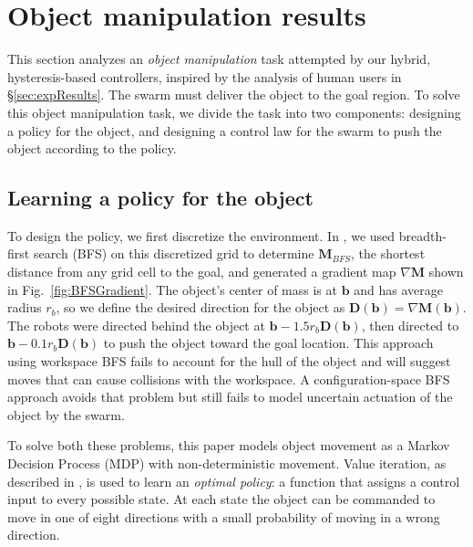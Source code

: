 
\section{Object manipulation results}\label{sec:exp}

This section analyzes an \emph{object manipulation} task attempted by our hybrid, hysteresis-based controllers, inspired by the analysis of human users in \S \ref{sec:expResults}.  
The swarm must deliver the object to the goal region.  To solve this object manipulation task, we divide the task into two components: designing a policy for the object, and designing a control law for the swarm to push the object according to the policy.

\subsection{Learning a policy for the object}\label{subsec:objectpolicy}

To design the policy, we first discretize the environment. 
In \cite{ShahrokhiIROS2015}, we used breadth-first search (BFS) on this discretized grid to determine $\mathbf{M}_{BFS}$, the shortest distance from any grid cell to the goal, and generated a gradient map $\nabla \mathbf{M}$  shown in Fig.~\ref{fig:BFSGradient}.  
The object's center of mass is at $\mathbf{b}$ and has average radius $r_b$, so we define the desired direction for the object as $\mathbf{D}(\mathbf{b}) = \nabla \mathbf{M}(\mathbf{b})$. 
The robots were directed behind the object at  $\mathbf{b} - 1.5 r_b \mathbf{D}(\mathbf{b})$, then directed to  $\mathbf{b} - 0.1 r_b \mathbf{D}(\mathbf{b})$ to push the object toward the goal location. 
This approach using workspace BFS fails to account for the hull of the object and will suggest moves that can cause collisions with the workspace. A configuration-space BFS approach avoids that problem but still fails to model uncertain actuation of the object by the swarm.

To solve both these problems, this paper models object movement as a Markov Decision Process (MDP) with non-deterministic movement.  
  Value iteration,  as described in \cite{Thrun2005}, is used to learn an \emph{optimal policy}: a function that assigns a control input to every possible state.
 At each state the object can be commanded to move in one of eight directions with a small probability of moving in a wrong direction. 
 
